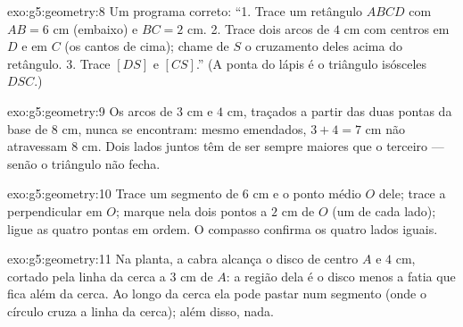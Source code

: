 \begin{solution}{exo:g5:geometry:8}
Um programa correto: ``1. Trace um retângulo $ABCD$ com $AB = 6$ cm
(embaixo) e $BC = 2$ cm. 2. Trace dois arcos de  $4$ cm com
centros em $D$ e em $C$ (os cantos de cima); chame de $S$ o
cruzamento deles acima do retângulo. 3. Trace $[DS]$ e $[CS]$.'' (A
ponta do lápis é o triângulo isósceles $DSC$.)
\end{solution}

\begin{solution}{exo:g5:geometry:9}
Os arcos de  $3$ cm e $4$ cm, traçados a partir das duas pontas
da base de $8$ cm, nunca se encontram: mesmo emendados,
$3 + 4 = 7$ cm não atravessam $8$ cm. Dois lados juntos têm de ser
sempre maiores que o terceiro --- senão o triângulo não fecha.
\end{solution}

\begin{solution}{exo:g5:geometry:10}
Trace um segmento de $6$ cm e o ponto médio $O$ dele; trace a
perpendicular em $O$; marque nela dois pontos a $2$ cm de $O$ (um de
cada lado); ligue as quatro pontas em ordem. O compasso confirma os
quatro lados iguais.
\end{solution}

\begin{solution}{exo:g5:geometry:11}
Na planta, a cabra alcança o disco de centro $A$ e  $4$ cm,
cortado pela linha da cerca a $3$ cm de $A$: a região dela é o disco
menos a fatia que fica além da cerca. Ao longo da cerca ela pode
pastar num segmento (onde o círculo cruza a linha da cerca); além
disso, nada.
\end{solution}
